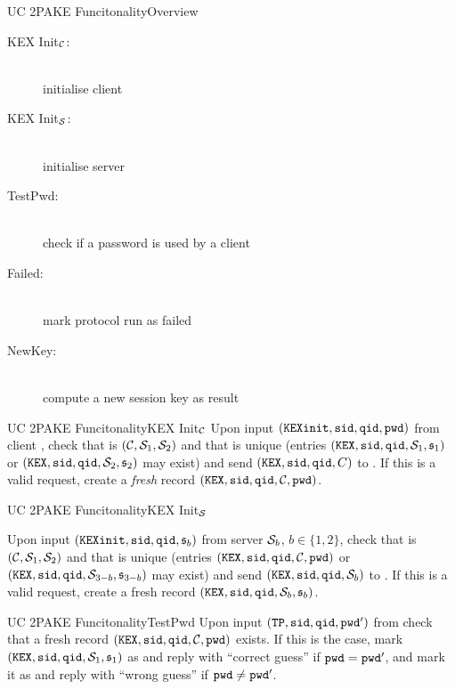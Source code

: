 \documentclass[notes,xcolor=dvipsnames]{beamer}
\begin{document}
\begin{frame}{UC 2PAKE Funcitonality}{Overview}
  \begin{description}

    \item[KEX Init$_\mathcal{C}$:] \hfill\\ initialise client
    \item[KEX Init$_\mathcal{S}$:] \hfill\\ initialise server
    \item[TestPwd:] \hfill\\ check if a password is used by a client
    \item[Failed:] \hfill\\ mark protocol run as failed
	  \item[NewKey:] \hfill\\ compute a new session key as result
	
  \end{description}
\end{frame}

\begin{frame}{UC 2PAKE Funcitonality}{KEX Init$_\mathcal{C}$}
    Upon input $(\mathtt{KEXinit}, \mathtt{sid}, \mathtt{qid}, \mathtt{pwd})$ from client \Client, check that \sid is $(\mathcal{C}, \mathcal{S}_1, \mathcal{S}_2)$ and that \qid is unique (entries $(\mathtt{KEX}, \mathtt{sid}, \mathtt{qid}, \mathcal{S}_{1}, \mathfrak{s}_{1})$ or $(\mathtt{KEX}, \mathtt{sid}, \mathtt{qid}, \mathcal{S}_{2}, \mathfrak{s}_{2})$ may exist) and send $(\mathtt{KEX}, \mathtt{sid}, \mathtt{qid}, C)$ to \SIM.
        If this is a valid request, create a \emph{fresh} record $(\mathtt{KEX}, \mathtt{sid}, \mathtt{qid}, \mathcal{C}, \mathtt{pwd})$.
\end{frame}

\begin{frame}{UC 2PAKE Funcitonality}{KEX Init$_\mathcal{S}$}
  
Upon input $(\mathtt{KEXinit}, \mathtt{sid}, \mathtt{qid}, \mathfrak{s}_b)$ from server $\mathcal{S}_b$, $b\in\{1,2\}$, check that \sid is $(\mathcal{C}, \mathcal{S}_1, \mathcal{S}_2)$ and that \qid is unique (entries $(\mathtt{KEX}, \mathtt{sid}, \mathtt{qid}, \mathcal{C}, \mathtt{pwd})$ or $(\mathtt{KEX}, \mathtt{sid}, \mathtt{qid}, \mathcal{S}_{3-b}, \mathfrak{s}_{3-b})$ may exist) and send $(\mathtt{KEX}, \mathtt{sid}, \mathtt{qid}, \mathcal{S}_b)$ to \SIM.
        If this is a valid request, create a fresh record $(\mathtt{KEX}, \mathtt{sid}, \mathtt{qid}, \mathcal{S}_b, \mathfrak{s}_b)$.
\end{frame}

\begin{frame}{UC 2PAKE Funcitonality}{TestPwd}  
    Upon input $(\mathtt{TP}, \mathtt{sid}, \mathtt{qid}, \mathtt{pwd}')$ from \SIM check that a fresh record $(\mathtt{KEX}, \mathtt{sid}, \mathtt{qid}, \mathcal{C}, \mathtt{pwd})$ exists. 
        If this is the case, mark $(\mathtt{KEX}, \mathtt{sid}, \mathtt{qid}, \mathcal{S}_1, \mathfrak{s}_1)$ as \compromised and reply with ``correct guess'' if $\mathtt{pwd}=\mathtt{pwd}'$, and mark it as \interrupted and reply with ``wrong guess'' if $\mathtt{pwd}\not=\mathtt{pwd}'$.
\end{frame}
      
\end{document}
